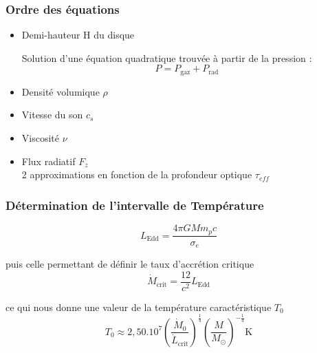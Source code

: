 \documentclass[french]{beamer}
\begin{document}
\begin{frame}
\frametitle{Ordre des équations}
         \begin{itemize}
      \item Demi-hauteur H du disque

      Solution d'une équation quadratique trouvée à partir de la pression :
      \begin{equation}
         P = P_\mathrm{gaz} + P_\mathrm{rad}
      \end{equation}
      \item Densité volumique $\rho$
      \item Vitesse du son $c_s$ 
      \item Viscosité $\nu$ 
      \item Flux radiatif $F_z$
      \\
      2 approximations en fonction de la profondeur optique $\tau_{eff}$
   \end{itemize}
\end{frame}



\begin{frame}
\frametitle{Détermination de l'intervalle de Température} 

   \begin{equation}
      L_\mathrm{Edd} = \frac{4\pi GMm_pc}{\sigma_e}
   \end{equation}

   puis celle permettant de définir le taux d’accrétion critique 
   \begin{equation}
      \dot{M}_\mathrm{crit} = \frac{12}{c^2}L_\mathrm{Edd} 
   \end{equation}

   ce qui nous donne une valeur de la température caractéristique $T_0$
   \begin{equation}
      T_0 \approx 2,50.10^7\left(\frac{\dot{M}_0}{\dot{L}_\mathrm{crit}}\right)^{\frac{1}{4}}\left(\frac{M}{M_\odot}\right)^{-\frac{1}{4}} \mathrm{K}
   \end{equation}


\end{frame}



\end{document}

